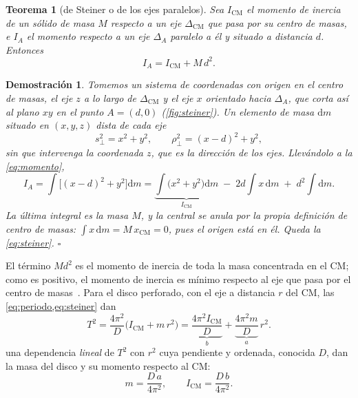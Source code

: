 \documentclass[a4paper,11pt]{amsart}
\numberwithin{equation}{section}
\newcommand{\Icm}{I_{\mathrm{CM}}}            %
\newcommand{\dif}{\mathrm{d}}
\theoremstyle{cienplano}
\newtheorem{teorema}[proposicion]{Teorema}
\theoremstyle{ciendef}
\theoremstyle{cienobs}
\newtheorem*{demostracion}{Demostración}
\begin{document}
\begin{teorema}[de Steiner o de los ejes paralelos]\label{teo:steiner}
Sea $\Icm$ el momento de inercia de un sólido de masa $M$ respecto a un eje
$\Delta_{\mathrm{CM}}$ que pasa por su centro de masas, e $I_A$ el momento
respecto a un eje $\Delta_{A}$ paralelo a él y situado a distancia $d$.
Entonces
\begin{equation}\label{eq:steiner}
  I_A=\Icm+M\,d^{2}.
\end{equation}
\end{teorema}

\begin{demostracion}
Tomemos un sistema de coordenadas con origen en el centro de masas, el eje
$z$ a lo largo de $\Delta_{\mathrm{CM}}$ y el eje $x$ orientado hacia
$\Delta_{A}$, que corta así al plano $xy$ en el punto $A=(d,0)$
(\cref{fig:steiner}). Un elemento de masa $\dif m$ situado en $(x,y,z)$
dista de cada eje
\begin{equation*}
  s_{\perp}^{2}=x^{2}+y^{2},
  \qquad
  \rho_{\perp}^{2}=(x-d)^{2}+y^{2},
\end{equation*}
sin que intervenga la coordenada $z$, que es la dirección de los ejes.
Llevándolo a la \cref{eq:momento},
\begin{equation*}
  I_A=\int\bigl[(x-d)^{2}+y^{2}\bigr]\dif m
     =\underbrace{\int\bigl(x^{2}+y^{2}\bigr)\dif m}_{\Icm}
     \;-\;2d\int x\,\dif m\;+\;d^{2}\!\int\dif m .
\end{equation*}
La última integral es la masa $M$, y la central se anula por la propia
definición de centro de masas: $\int x\,\dif m=M\,x_{\mathrm{CM}}=0$, pues el
origen está en él. Queda la \cref{eq:steiner}. \hfill$\square$
\end{demostracion}

El término $M d^{2}$ es el momento de inercia de toda la masa concentrada en
el CM; como es positivo, el momento de inercia es mínimo respecto al eje que
pasa por el centro de masas~\cite{FI-FAB}. Para el disco perforado, con el
eje a distancia $r$ del CM, las \cref{eq:periodo,eq:steiner} dan
\begin{equation}\label{eq:steinerT}
  T^{2}=\frac{4\pi^{2}}{D}\bigl(\Icm+m\,r^{2}\bigr)
       =\underbrace{\frac{4\pi^{2}\Icm}{D}}_{b}
       +\underbrace{\frac{4\pi^{2}m}{D}}_{a}\,r^{2}.
\end{equation}
una dependencia \emph{lineal} de $T^{2}$ con $r^{2}$ cuya pendiente y
ordenada, conocida $D$, dan la masa del disco y su momento respecto al CM:
\begin{equation}\label{eq:disco}
  m=\frac{D\,a}{4\pi^{2}},
  \qquad
  \Icm=\frac{D\,b}{4\pi^{2}}.
\end{equation}
\end{document}

